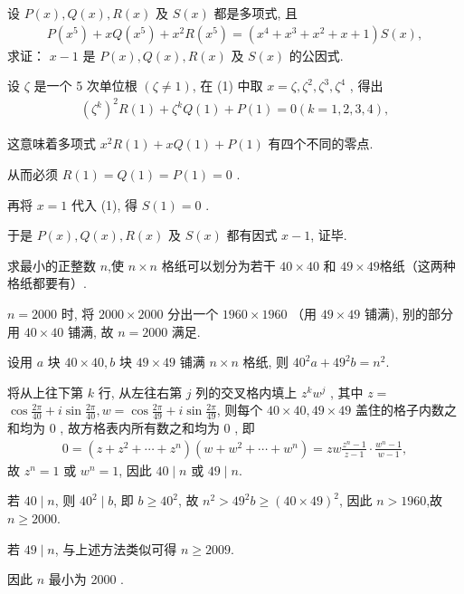 \begin{example}
	设 $P(x), Q(x), R(x)$ 及 $S(x)$ 都是多项式, 且
	\begin{align*}
		P\left(x^5\right)+x Q\left(x^5\right)+x^2 R\left(x^5\right)=\left(x^4+x^3+x^2+x+1\right) S(x),
	\end{align*}
	求证： $x-1$ 是 $P(x), Q(x), R(x)$ 及 $S(x)$ 的公因式.
\end{example}
\begin{solution}
	设 $\zeta$ 是一个 5 次单位根 $(\zeta \neq 1)$, 在 (1) 中取 $x=\zeta, \zeta^2, \zeta^3, \zeta^4$ , 得出
	\begin{align*}
		\left(\zeta^k\right)^2 R(1)+\zeta^k Q(1)+P(1)=0(k=1,2,3,4),
	\end{align*}

	这意味着多项式 $x^2 R(1)+x Q(1)+P(1)$ 有四个不同的零点.

	从而必须 $R(1)=Q(1)=P(1)=0$ .

	再将 $x=1$ 代入 (1), 得 $S(1)=0$ .

	于是 $P(x), Q(x), R(x)$ 及 $S(x)$ 都有因式 $x-1$, 证毕.
\end{solution}

\begin{example}
	求最小的正整数 $n$,使 $n \times n$ 格纸可以划分为若干 $40 \times 40$ 和 $49 \times 49$格纸（这两种格纸都要有）.
\end{example}
\begin{solution}
	$n=2000$ 时, 将 $2000 \times 2000$ 分出一个 $1960 \times 1960$ （用 $49 \times 49$ 铺满), 别的部分用 $40 \times 40$ 铺满, 故 $n=2000$ 满足.

	设用 $a$ 块 $40 \times 40, b$ 块 $49 \times 49$ 铺满 $n \times n$ 格纸, 则 $40^2 a+49^2 b=n^2$.

	将从上往下第 $k$ 行, 从左往右第 $j$ 列的交叉格内填上 $z^k w^j$ , 其中 $z=$ $\cos \frac{2 \pi}{40}+i \sin \frac{2 \pi}{40}, w=\cos \frac{2 \pi}{49}+i \sin \frac{2 \pi}{49}$, 则每个 $40 \times 40 ,  49 \times 49$ 盖住的格子内数之和均为 0 , 故方格表内所有数之和均为 0 , 即
	\begin{align*}
		0=\left(z+z^2+\cdots+z^n\right)\left(w+w^2+\cdots+w^n\right)=z w \frac{z^n-1}{z-1} \cdot \frac{w^n-1}{w-1},
	\end{align*}
	故 $z^n=1$ 或 $w^n=1$, 因此 $40 \mid n$ 或 $49 \mid n$.

	若 $40 \mid n$, 则 $40^2 \mid b$, 即 $b \geqslant 40^2$, 故 $n^2>49^2 b \geqslant(40 \times 49)^2$, 因此 $n>1960$,故 $n \geqslant 2000$.

	若 $49 \mid n$, 与上述方法类似可得 $n \geqslant 2009$.

	因此 $n$ 最小为 2000 .
\end{solution}


